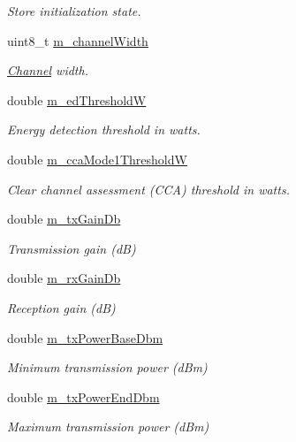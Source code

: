 \begin{DoxyCompactItemize}
\begin{DoxyCompactList}\small\item\em Store initialization state. \end{DoxyCompactList}\item 
uint8\+\_\+t \hyperlink{classns3_1_1WifiPhy_a16c266805e99eda99af83a8291f1e2c5}{m\+\_\+channel\+Width}
\begin{DoxyCompactList}\small\item\em \hyperlink{classns3_1_1Channel}{Channel} width. \end{DoxyCompactList}\item 
double \hyperlink{classns3_1_1WifiPhy_a675b54fbadd8be600cdbe65e1c20a002}{m\+\_\+ed\+ThresholdW}
\begin{DoxyCompactList}\small\item\em Energy detection threshold in watts. \end{DoxyCompactList}\item 
double \hyperlink{classns3_1_1WifiPhy_af3b182cae6a9df918d777fe069adf824}{m\+\_\+cca\+Mode1\+ThresholdW}
\begin{DoxyCompactList}\small\item\em Clear channel assessment (C\+CA) threshold in watts. \end{DoxyCompactList}\item 
double \hyperlink{classns3_1_1WifiPhy_a9da4312858797f77c3c08e3d9623c2d0}{m\+\_\+tx\+Gain\+Db}
\begin{DoxyCompactList}\small\item\em Transmission gain (dB) \end{DoxyCompactList}\item 
double \hyperlink{classns3_1_1WifiPhy_a04e38365fd444f35a3ffd84ec8e54b0e}{m\+\_\+rx\+Gain\+Db}
\begin{DoxyCompactList}\small\item\em Reception gain (dB) \end{DoxyCompactList}\item 
double \hyperlink{classns3_1_1WifiPhy_a2c13c9ac534ed778bd9600b6ff988e87}{m\+\_\+tx\+Power\+Base\+Dbm}
\begin{DoxyCompactList}\small\item\em Minimum transmission power (d\+Bm) \end{DoxyCompactList}\item 
double \hyperlink{classns3_1_1WifiPhy_ac2e14dc0931c5808c5338a57dfb4e47b}{m\+\_\+tx\+Power\+End\+Dbm}
\begin{DoxyCompactList}\small\item\em Maximum transmission power (d\+Bm) \end{DoxyCompactList}\item 

\end{DoxyCompactItemize}
